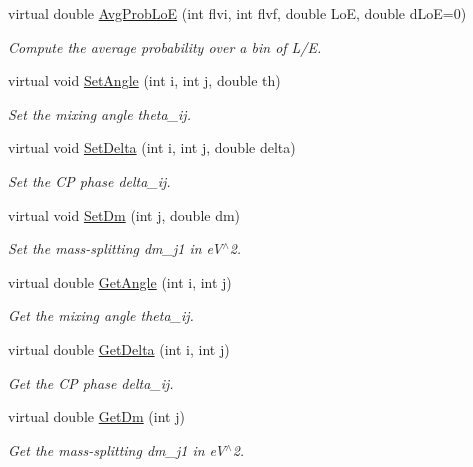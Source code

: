 \begin{DoxyCompactItemize}
virtual double \hyperlink{classOscProb_1_1PMNS__Base_ac19a92f4ef428a7333ca8eed76fca637}{Avg\+Prob\+LoE} (int flvi, int flvf, double LoE, double d\+LoE=0)
\begin{DoxyCompactList}\small\item\em Compute the average probability over a bin of L/E. \end{DoxyCompactList}\item 
virtual void \hyperlink{classOscProb_1_1PMNS__Base_ace7875cf6d3bec161a2b7ed2690aec34}{Set\+Angle} (int i, int j, double th)
\begin{DoxyCompactList}\small\item\em Set the mixing angle theta\+\_\+ij. \end{DoxyCompactList}\item 
virtual void \hyperlink{classOscProb_1_1PMNS__Base_a4bef78cfcfc4e70b4ce79cdb8862c0a3}{Set\+Delta} (int i, int j, double delta)
\begin{DoxyCompactList}\small\item\em Set the CP phase delta\+\_\+ij. \end{DoxyCompactList}\item 
virtual void \hyperlink{classOscProb_1_1PMNS__Base_a492243b22fb1b783cd2943f507cff970}{Set\+Dm} (int j, double dm)
\begin{DoxyCompactList}\small\item\em Set the mass-\/splitting dm\+\_\+j1 in e\+V$^\wedge$2. \end{DoxyCompactList}\item 
virtual double \hyperlink{classOscProb_1_1PMNS__Base_acee137091304c919642293ddf015bbc8}{Get\+Angle} (int i, int j)
\begin{DoxyCompactList}\small\item\em Get the mixing angle theta\+\_\+ij. \end{DoxyCompactList}\item 
virtual double \hyperlink{classOscProb_1_1PMNS__Base_adb8dbc91d4286d2e7c8f768c59476241}{Get\+Delta} (int i, int j)
\begin{DoxyCompactList}\small\item\em Get the CP phase delta\+\_\+ij. \end{DoxyCompactList}\item 
virtual double \hyperlink{classOscProb_1_1PMNS__Base_ad26815ac5f4805d1259817e4936e5f8f}{Get\+Dm} (int j)
\begin{DoxyCompactList}\small\item\em Get the mass-\/splitting dm\+\_\+j1 in e\+V$^\wedge$2. \end{DoxyCompactList}\item 

\end{DoxyCompactItemize}
